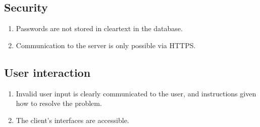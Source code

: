 \subsection{Security}\label{subsec:security}
\begin{enumerate}[label=\textit{NF\arabic*}]
    \item \label{nf:1} Passwords are not stored in cleartext in the database.
    \item \label{nf:2} Communication to the server is only possible via HTTPS\@.
\end{enumerate}

\subsection{User interaction}\label{subsec:user-interaction}
\begin{enumerate}[label=\textit{NF\arabic*}, resume]
    \item \label{nf:3} Invalid user input is clearly communicated to the user, and instructions given how to resolve the problem.
    \item \label{nf:4} The client's interfaces are accessible.
\end{enumerate}
